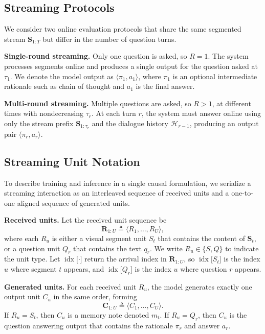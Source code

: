 \documentclass{article}
\begin{document}
\subsection{Streaming Protocols}
\label{sec:paradigm:protocols}

We consider two online evaluation protocols that share the same segmented stream $\mathbf{S}_{1:T}$ but differ in the number of question turns.

\noindent\textbf{Single-round streaming.}
Only one question is asked, so $R=1$. The system processes segments online and produces a single output for the question asked at $\tau_1$. We denote the model output as $\langle \pi_1, a_1\rangle$, where $\pi_1$ is an optional intermediate rationale such as chain of thought and $a_1$ is the final answer.

\noindent\textbf{Multi-round streaming.}
Multiple questions are asked, so $R>1$, at different times with nondecreasing $\tau_r$. At each turn $r$, the system must answer online using only the stream prefix $\mathbf{S}_{1:\tau_r}$ and the dialogue history $\mathcal{H}_{r-1}$, producing an output pair $\langle \pi_r, a_r\rangle$.

\subsection{Streaming Unit Notation}
\label{sec:paradigm:notation}

To describe training and inference in a single causal formulation, we serialize a streaming interaction as an interleaved sequence of received units and a one-to-one aligned sequence of generated units.

\noindent\textbf{Received units.}
Let the received unit sequence be
\begin{equation}
\mathbf{R}_{1:U} \triangleq \langle R_1,\ldots,R_U\rangle ,
\end{equation}
where each $R_u$ is either a visual segment unit $S_t$ that contains the content of $\mathbf{S}_t$, or a question unit $Q_r$ that contains the text $q_r$. We write $R_u \in \{S,Q\}$ to indicate the unit type. Let $\operatorname{idx}\lbrack \cdot \rbrack$ return the arrival index in $\mathbf{R}_{1:U}$, so $\operatorname{idx}\lbrack S_t \rbrack$ is the index $u$ where segment $t$ appears, and $\operatorname{idx}\lbrack Q_r \rbrack$ is the index $u$ where question $r$ appears.

\noindent\textbf{Generated units.}
For each received unit $R_u$, the model generates exactly one output unit $C_u$ in the same order, forming
\begin{equation}
\mathbf{C}_{1:U} \triangleq \langle C_1,\ldots,C_U\rangle .
\end{equation}
If $R_u=S_t$, then $C_u$ is a memory note denoted $m_t$. If $R_u=Q_r$, then $C_u$ is the question answering output that contains the rationale $\pi_r$ and answer $a_r$.
\end{document}

